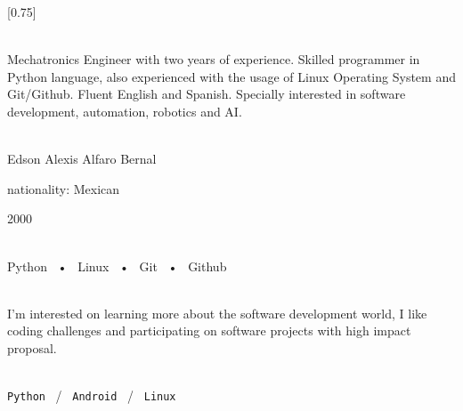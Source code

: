 \documentclass[lighthipster]{simplehipstercv}
\begin{document}
\setlength{\columnsep}{1.5cm}
[0.75]
\begin{paracol}{2}

\paracolbackgroundoptions



\footnotesize
{\setasidefontcolour
\flushleft

 \\[0.5em]

{\footnotesize
Mechatronics Engineer with two years of experience. Skilled programmer in Python
language, also experienced with the usage of Linux Operating System and Git/Github.
\newline Fluent English and Spanish.
\newline Specially interested in software development, automation, robotics and AI.}
\bigskip



 \\[0.5em]
Edson Alexis Alfaro Bernal 

nationality: Mexican 

2000 


\bigskip

 \\[0.5em]

Python ~•~ Linux ~•~ Git ~•~ Github

\bigskip



\bigskip

\\[0.5em]

I'm interested on learning more about the software development world, I like
coding challenges and participating on software projects with high impact 
proposal.

\bigskip

\\[0.5em]

\texttt{Python} ~/~ \texttt{Android} ~/~ \texttt{Linux}

}
\end{paracol}
\end{document}
